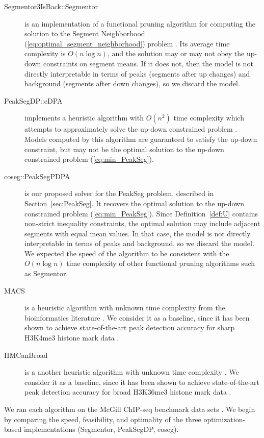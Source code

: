 \documentclass{article}
\begin{document}
\begin{description}
\item[Segmentor3IsBack::Segmentor] is an implementation of a
  functional pruning algorithm for computing the solution to the
  Segment Neighborhood (\ref{eq:optimal_segment_neighborhood}) problem
  \citep{Segmentor}. Its average time complexity is $O(n \log n)$,
  and the solution may or may not obey the up-down constraints on
  segment means. If it does not, then the model is not directly
  interpretable in terms of peaks (segments after up changes) and
  background (segments after down changes), so we discard the model.
\item[PeakSegDP::cDPA] implements a heuristic algorithm with $O(n^2)$
  time complexity which attempts to approximately solve the up-down
  constrained problem \citep{HOCKING-PeakSeg}. Models computed by this
  algorithm are guaranteed to satisfy the up-down constraint, but may
  not be the optimal solution to the up-down constrained problem
  (\ref{eq:min_PeakSeg}).
\item[coseg::PeakSegPDPA] is our proposed solver for the PeakSeg
  problem, described in Section~\ref{sec:PeakSeg}. It recovers the
  optimal solution to the up-down constrained problem
  (\ref{eq:min_PeakSeg}).  Since Definition~\ref{def:U} contains
  non-strict inequality constraints, the optimal solution may include
  adjacent segments with equal mean values. In that case, the model is
  not directly interpretable in terms of peaks and background, so we
  discard the model. We expected the speed of the algorithm to be
  consistent with the $O(n\log n)$ time complexity of other functional
  pruning algorithms such as Segmentor.
\item[MACS] is a heuristic algorithm with unknown time complexity from
  the bioinformatics literature \citep{MACS}. We consider it as a
  baseline, since it has been shown to achieve state-of-the-art peak
  detection accuracy for sharp H3K4me3 histone mark data
  \citep{HOCKING-PeakSeg}.
\item[HMCanBroad] is a another heuristic algorithm with unknown time
  complexity \citep{HMCan}. We consider it as a baseline, since it has
  been shown to achieve state-of-the-art peak detection accuracy for
  broad H3K36me3 histone mark data \citep{HOCKING-PeakSeg}.
\end{description}

We ran each algorithm on the McGill ChIP-seq benchmark data sets
\citep{HOCKING2016-chipseq}. We begin by comparing the speed,
feasibility, and optimality of the three optimization-based
implementations (Segmentor, PeakSegDP, coseg).
\end{document}
